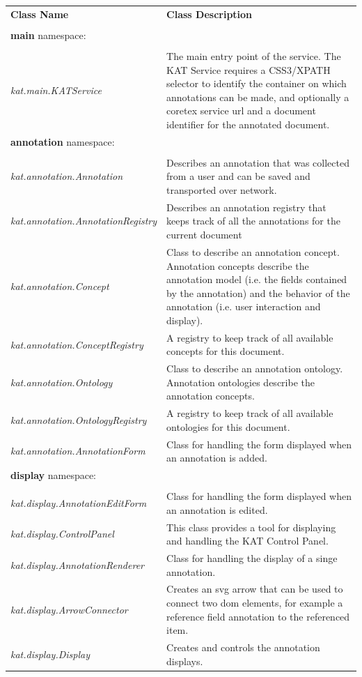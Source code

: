 \documentclass[a4paper, 12pt, notitlepage]{report}
\begin{document}
\begin{tabular}{p{6cm} | p{8cm} }
 \large{\textbf{Class Name}} & \large{\textbf{Class Description}}\\ \\ \hline
 \textbf{main} namespace: \\\\ \hline
 \textit{kat.main.KATService} & The main entry point of the service. The KAT Service requires a CSS3/XPATH selector to identify the container on which annotations can be made,
 and optionally a coretex service url and a document identifier for the annotated document.\\ \hline
 \textbf{annotation} namespace: \\\\ \hline
 \textit{kat.annotation.Annotation} & Describes an annotation that was collected from a user and can be saved and transported over
 network.\\ \hline
 \textit{kat.annotation.AnnotationRegistry} & Describes an annotation registry that keeps track of all the annotations for the current document \\ \hline
 \textit{kat.annotation.Concept} & Class to describe an annotation concept. Annotation concepts describe the annotation model (i.e. the fields contained
 by the annotation) and the behavior of the annotation (i.e. user interaction and display).\\ \hline
 \textit{kat.annotation.ConceptRegistry} & A registry to keep track of all available concepts for this document.\\ \hline
 \textit{kat.annotation.Ontology} & Class to describe an annotation ontology. Annotation ontologies describe the annotation concepts.\\ \hline
 \textit{kat.annotation.OntologyRegistry} & A registry to keep track of all available ontologies for this document.\\ \hline
 \textit{kat.annotation.AnnotationForm} & Class for handling the form displayed when an annotation is added.\\ \hline
 \textbf{display} namespace: \\\\ \hline
 \textit{kat.display.AnnotationEditForm} & Class for handling the form displayed when an annotation is edited.\\ \hline
 \textit{kat.display.ControlPanel} & This class provides a tool for displaying and handling the KAT Control Panel.\\ \hline
 \textit{kat.display.AnnotationRenderer} & Class for handling the display of a singe annotation.\\ \hline
 \textit{kat.display.ArrowConnector} &  Creates an svg arrow that can be used to connect two dom elements, for example a reference field annotation to the referenced item.\\ \hline
 \textit{kat.display.Display} & Creates and controls the annotation displays.\\ \hline
\end{tabular}
\end{document}
